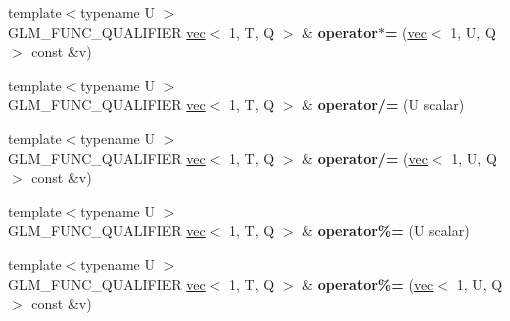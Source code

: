 \begin{DoxyCompactItemize}
\item 
\mbox{\label{structglm_1_1vec_3_011_00_01T_00_01Q_01_4_ad99d855b46377ab71a047c3c62c41054}} 
{\footnotesize template$<$typename U $>$ }\\G\+L\+M\+\_\+\+F\+U\+N\+C\+\_\+\+Q\+U\+A\+L\+I\+F\+I\+ER \hyperlink{structglm_1_1vec}{vec}$<$ 1, T, Q $>$ \& {\bfseries operator$\ast$=} (\hyperlink{structglm_1_1vec}{vec}$<$ 1, U, Q $>$ const \&v)
\item 
\mbox{\label{structglm_1_1vec_3_011_00_01T_00_01Q_01_4_a25bbfeb0e44bca9205cd7b127b566ba8}} 
{\footnotesize template$<$typename U $>$ }\\G\+L\+M\+\_\+\+F\+U\+N\+C\+\_\+\+Q\+U\+A\+L\+I\+F\+I\+ER \hyperlink{structglm_1_1vec}{vec}$<$ 1, T, Q $>$ \& {\bfseries operator/=} (U scalar)
\item 
\mbox{\label{structglm_1_1vec_3_011_00_01T_00_01Q_01_4_a8bf658f58cfbd59ca4421fb0ba1b0eb5}} 
{\footnotesize template$<$typename U $>$ }\\G\+L\+M\+\_\+\+F\+U\+N\+C\+\_\+\+Q\+U\+A\+L\+I\+F\+I\+ER \hyperlink{structglm_1_1vec}{vec}$<$ 1, T, Q $>$ \& {\bfseries operator/=} (\hyperlink{structglm_1_1vec}{vec}$<$ 1, U, Q $>$ const \&v)
\item 
\mbox{\label{structglm_1_1vec_3_011_00_01T_00_01Q_01_4_a41cf765caed386c25ead2b2420b61039}} 
{\footnotesize template$<$typename U $>$ }\\G\+L\+M\+\_\+\+F\+U\+N\+C\+\_\+\+Q\+U\+A\+L\+I\+F\+I\+ER \hyperlink{structglm_1_1vec}{vec}$<$ 1, T, Q $>$ \& {\bfseries operator\%=} (U scalar)
\item 
\mbox{\label{structglm_1_1vec_3_011_00_01T_00_01Q_01_4_a78d638cf272b3293078df0aab1aedb67}} 
{\footnotesize template$<$typename U $>$ }\\G\+L\+M\+\_\+\+F\+U\+N\+C\+\_\+\+Q\+U\+A\+L\+I\+F\+I\+ER \hyperlink{structglm_1_1vec}{vec}$<$ 1, T, Q $>$ \& {\bfseries operator\%=} (\hyperlink{structglm_1_1vec}{vec}$<$ 1, U, Q $>$ const \&v)
\item 
\mbox{\label{structglm_1_1vec_3_011_00_01T_00_01Q_01_4_a60499c612492b52060a0e9e6a5890fc7}} 

\end{DoxyCompactItemize}
